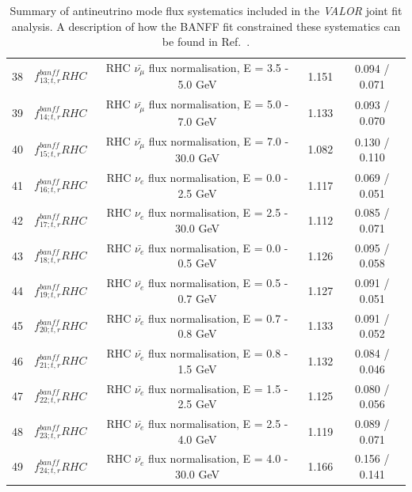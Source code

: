 {\begin{table}
\begin{tabular}{| c | c | c | c | c |}
38       & $f_{13; t, r}^{banff} RHC$  & RHC $\bar{\nu_\mu}$ flux normalisation, E = 3.5 - 5.0 GeV   & 1.151   & 0.094 / 0.071 \\ 
39       & $f_{14; t, r}^{banff} RHC$  & RHC $\bar{\nu_\mu}$ flux normalisation, E = 5.0 - 7.0 GeV   & 1.133   & 0.093 / 0.070 \\ 
40      &  $f_{15; t, r}^{banff} RHC$  & RHC $\bar{\nu_\mu}$ flux normalisation, E = 7.0 - 30.0 GeV  & 1.082   & 0.130 / 0.110 \\ 
41     &   $f_{16; t, r}^{banff} RHC$  & RHC $\nu_e$ flux normalisation, E = 0.0 - 2.5 GeV           & 1.117   & 0.069 / 0.051 \\ 
42     &   $f_{17; t, r}^{banff} RHC$  & RHC $\nu_e$ flux normalisation, E = 2.5 - 30.0 GeV          & 1.112   & 0.085 / 0.071 \\ 
43     &   $f_{18; t, r}^{banff} RHC$  & RHC $\bar{\nu_e}$ flux normalisation, E = 0.0 - 0.5 GeV     & 1.126   & 0.095 / 0.058 \\ 
44     &   $f_{19; t, r}^{banff} RHC$  & RHC $\bar{\nu_e}$ flux normalisation, E = 0.5 - 0.7 GeV     & 1.127   & 0.091 / 0.051 \\ 
45     &   $f_{20; t, r}^{banff} RHC$  & RHC $\bar{\nu_e}$ flux normalisation, E = 0.7 - 0.8 GeV     & 1.133   & 0.091 / 0.052 \\ 
46      &  $f_{21; t, r}^{banff} RHC$  & RHC $\bar{\nu_e}$ flux normalisation, E = 0.8 - 1.5 GeV     & 1.132   & 0.084 / 0.046 \\ 
47      &  $f_{22; t, r}^{banff} RHC$  & RHC $\bar{\nu_e}$ flux normalisation, E = 1.5 - 2.5 GeV     & 1.125   & 0.080 / 0.056 \\ 
48      &  $f_{23; t, r}^{banff} RHC$  & RHC $\bar{\nu_e}$ flux normalisation, E = 2.5 - 4.0 GeV     & 1.119   & 0.089 / 0.071 \\ 
49      &  $f_{24; t, r}^{banff} RHC$  & RHC $\bar{\nu_e}$ flux normalisation, E = 4.0 - 30.0 GeV    & 1.166   & 0.156 / 0.141 \\ 

\hline

\end{tabular}

\caption{
Summary of antineutrino mode flux systematics included in the {\em VALOR} joint fit analysis.
A description of how the BANFF fit constrained these systematics can be found in Ref.~\cite{BANFF2015}.
}
\label{tab:banff_uncertainties_flux_rhc}

\end{table}





}
